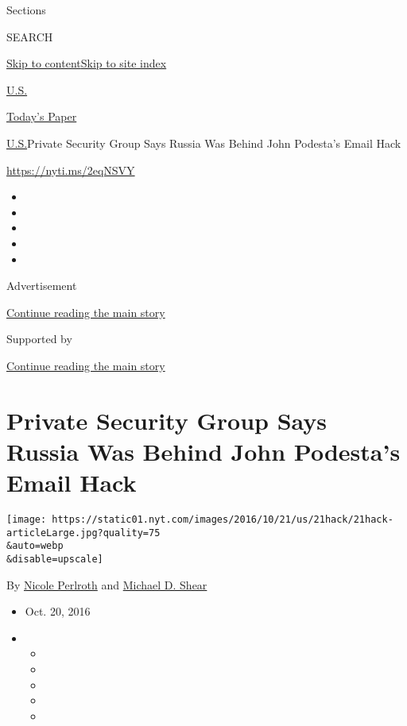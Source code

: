 Sections

SEARCH

\protect\hyperlink{site-content}{Skip to
content}\protect\hyperlink{site-index}{Skip to site index}

\href{https://www.nytimes.com/section/us}{U.S.}

\href{https://myaccount.nytimes.com/auth/login?response_type=cookie\&client_id=vi}{}

\href{https://www.nytimes.com/section/todayspaper}{Today's Paper}

\href{/section/us}{U.S.}\textbar{}Private Security Group Says Russia Was
Behind John Podesta's Email Hack

\url{https://nyti.ms/2eqNSVY}

\begin{itemize}
\item
\item
\item
\item
\item
\end{itemize}

Advertisement

\protect\hyperlink{after-top}{Continue reading the main story}

Supported by

\protect\hyperlink{after-sponsor}{Continue reading the main story}

\hypertarget{private-security-group-says-russia-was-behind-john-podestas-email-hack}{%
\section{Private Security Group Says Russia Was Behind John Podesta's
Email
Hack}\label{private-security-group-says-russia-was-behind-john-podestas-email-hack}}

\texttt{[image: https://static01.nyt.com/images/2016/10/21/us/21hack/21hack-articleLarge.jpg?quality=75\\\&auto=webp\\\&disable=upscale]}

By \href{http://www.nytimes.com/by/nicole-perlroth}{Nicole Perlroth} and
\href{http://www.nytimes.com/by/michael-d-shear}{Michael D. Shear}

\begin{itemize}
\item
  Oct. 20, 2016
\item
  \begin{itemize}
  \item
  \item
  \item
  \item
  \item
  \end{itemize}
\end{itemize}

